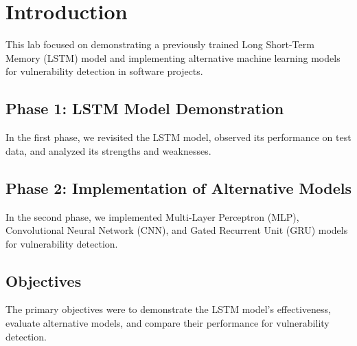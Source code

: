 \chapter{Introduction}\label{chap:introduction}

This lab focused on demonstrating a previously trained Long Short-Term Memory (LSTM) model and implementing alternative machine learning models for vulnerability detection in software projects.

\section{Phase 1: LSTM Model Demonstration}
In the first phase, we revisited the LSTM model, observed its performance on test data, and analyzed its strengths and weaknesses.

\section{Phase 2: Implementation of Alternative Models}
In the second phase, we implemented Multi-Layer Perceptron (MLP), Convolutional Neural Network (CNN), and Gated Recurrent Unit (GRU) models for vulnerability detection.

\section{Objectives}
The primary objectives were to demonstrate the LSTM model's effectiveness, evaluate alternative models, and compare their performance for vulnerability detection.
